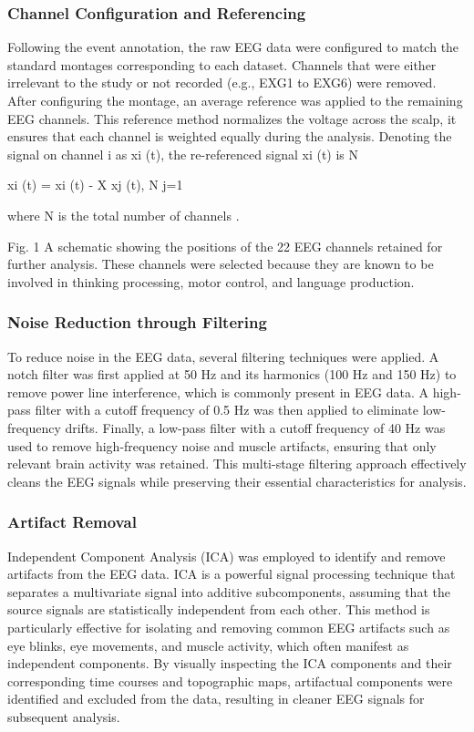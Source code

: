 \documentclass[pdflatex,sn-mathphys-num]{sn-jnl}
\theoremstyle{thmstyleone}%
\theoremstyle{thmstyletwo}%
\theoremstyle{thmstylethree}%
\begin{document}
\subsubsection{Channel Configuration and Referencing}
Following the event annotation, the raw EEG data were configured to match the
standard montages corresponding to each dataset. Channels that were either irrelevant
to the study or not recorded (e.g., EXG1 to EXG6) were removed. After configuring
the montage, an average reference was applied to the remaining EEG channels. This
reference method normalizes the voltage across the scalp, it ensures that each channel
is weighted equally during the analysis. Denoting the signal on channel i as xi (t), the
re-referenced signal x\textquotesingle i (t) is
N

x\textquotesingle i (t) = xi (t) - X
xj (t),
N j=1

where N is the total number of channels \cite{nunez2006electric}.

Fig. 1 A schematic showing the positions of the 22 EEG channels retained for further analysis.
These channels were selected because they are known to be involved in thinking processing, motor
control, and language production.

\subsubsection{Noise Reduction through Filtering}
To reduce noise in the EEG data, several filtering techniques were applied. A notch
filter was first applied at 50 Hz and its harmonics (100 Hz and 150 Hz) to remove
power line interference, which is commonly present in EEG data. A high-pass filter
with a cutoff frequency of 0.5 Hz was then applied to eliminate low-frequency drifts.
Finally, a low-pass filter with a cutoff frequency of 40 Hz was used to remove high-frequency noise and muscle artifacts, ensuring that only relevant brain activity was retained. This multi-stage filtering approach effectively cleans the EEG signals while preserving their essential characteristics for analysis.

\subsubsection{Artifact Removal}
Independent Component Analysis (ICA) was employed to identify and remove artifacts from the EEG data. ICA is a powerful signal processing technique that separates a multivariate signal into additive subcomponents, assuming that the source signals are statistically independent from each other. This method is particularly effective for isolating and removing common EEG artifacts such as eye blinks, eye movements, and muscle activity, which often manifest as independent components. By visually inspecting the ICA components and their corresponding time courses and topographic maps, artifactual components were identified and excluded from the data, resulting in cleaner EEG signals for subsequent analysis.
\end{document}
